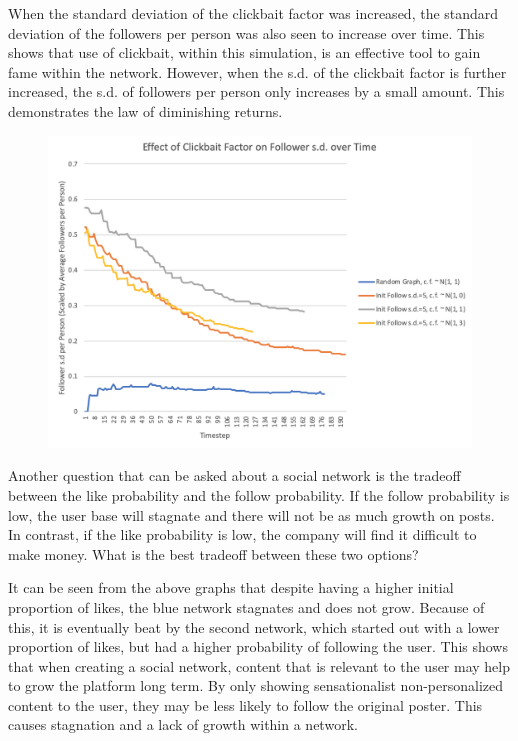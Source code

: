 \documentclass{article}
\begin{document}
When the standard deviation of the clickbait factor was increased, the standard
deviation of the followers per person was also seen to increase over time.
This shows that use of clickbait, within this simulation, is an effective
tool to gain fame within the network.
However, when the s.d. of the clickbait factor is further increased,
the s.d. of followers per person only increases by a small amount.
This demonstrates the law of diminishing returns.

\begin{figure}[H]
\centering
\includegraphics[width=\linewidth]{follSd}
\end{figure}

Another question that can be asked about a social network is
the tradeoff between the like probability and the follow probability.
If the follow probability is low, the user base will stagnate and there will
not be as much growth on posts.
In contrast, if the like probability is low, the company will find it difficult
to make money. What is the best tradeoff between these two options?

It can be seen from the above graphs that despite having a higher initial
proportion of likes, the blue network stagnates and does not grow. Because of this,
it is eventually beat by the second network, which started out with a lower proportion
of likes, but had a higher probability of following the user.
This shows that when creating a social network, content that is relevant
to the user may help to grow the platform long term. By only showing
sensationalist non-personalized content to the user, they may be less likely to follow the original poster.
This causes stagnation and a lack of growth within a network.
\end{document}

